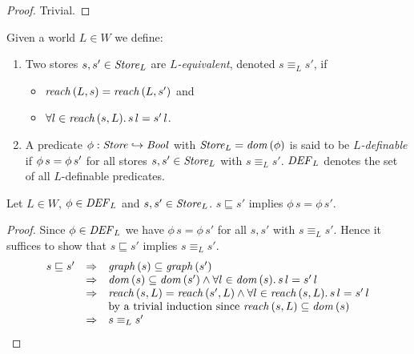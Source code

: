 \documentclass[12pt,a4paper]{report}
\newcommand{\DEF}{\nstyle{DEF}}
\begin{document}
\begin{proof}
  Trivial.
\end{proof}

\begin{definition}
  Given a world $L \in W$ we define:
  \begin{enumerate}
    \item Two stores $s,s'\in\mathit{Store}_L$ are {\em $L$-equivalent}, denoted $s \equiv_L s'$, if
          \begin{itemize}
            \item $\mathit{reach}\,(L,s) = \mathit{reach}\,(L,s')$ and
            \item $\forall l\in\mathit{reach}\,(s,L).\,s\,l=s'\,l$.
          \end{itemize}

    \item A predicate $\phi:\mathit{Store} \hookrightarrow \mathit{Bool}$ with $\mathit{Store}_L = \mathit{dom}\,(\phi)$ is said to be
          {\em $L$-definable} if $\phi\,s = \phi\,s'$ for all stores
          $s,s'\in\mathit{Store}_L$ with $s \equiv_L s'$. $\DEF_L$ denotes the set of all $L$-definable
          predicates.
  \end{enumerate}
\end{definition}

\begin{lemma}[$L$-definability] \label{lemma:L_definability}
  Let $L \in W$, $\phi \in \DEF_L$ and $s,s' \in \mathit{Store}_L$. $s \sqsubseteq s'$ implies
  $\phi\,s = \phi\,s'$.
\end{lemma}

\begin{proof}
  Since $\phi \in \DEF_L$ we have $\phi\,s = \phi\,s'$ for all $s,s'$ with $s \equiv_L s'$. Hence
  it suffices to show that $s \sqsubseteq s'$ implies $s \equiv_L s'$.
  \[\begin{array}{rcl}
    s \sqsubseteq s'
    &\Rightarrow& \mathit{graph}\,(s) \subseteq \mathit{graph}\,(s') \\
    &\Rightarrow& \mathit{dom}\,(s) \subseteq \mathit{dom}\,(s') \wedge \forall l\in\mathit{dom}\,(s).\,s\,l = s'\,l \\
    &\Rightarrow& \mathit{reach}\,(s,L) = \mathit{reach}\,(s',L) \wedge \forall l\in\mathit{reach}\,(s,L).\,s\,l = s'\,l \\
    &           & \text{by a trivial induction since $\mathit{reach}\,(s,L) \subseteq \mathit{dom}\,(s)$} \\
    &\Rightarrow& s \equiv_L s'
  \end{array}\]
\end{proof}
\end{document}
